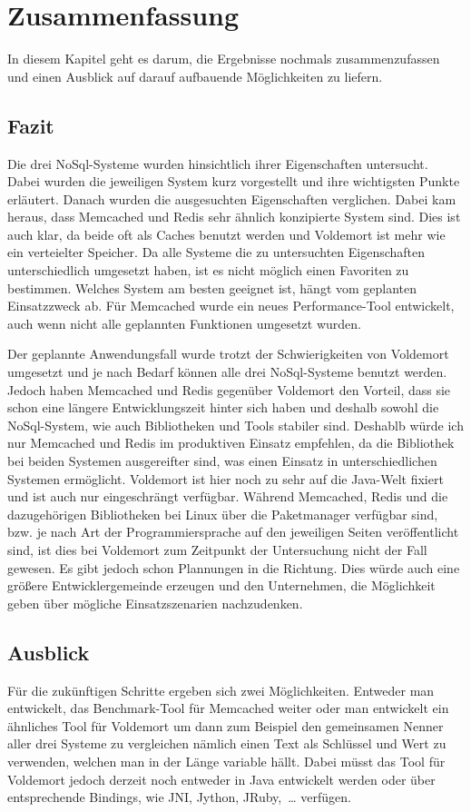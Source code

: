 \chapter{Zusammenfassung}
In diesem Kapitel geht es darum, die Ergebnisse nochmals zusammenzufassen und
einen Ausblick auf darauf aufbauende Möglichkeiten zu liefern.

\section{Fazit}
Die drei NoSql-Systeme wurden hinsichtlich ihrer Eigenschaften untersucht.
Dabei wurden die jeweiligen System kurz vorgestellt und ihre wichtigsten Punkte
erläutert. Danach wurden die ausgesuchten Eigenschaften verglichen. Dabei kam
heraus, dass Memcached und Redis sehr ähnlich konzipierte System sind. Dies ist
auch klar, da beide oft als Caches benutzt werden und Voldemort ist mehr wie
ein verteielter Speicher. Da alle Systeme die zu untersuchten Eigenschaften
unterschiedlich umgesetzt haben, ist es nicht möglich einen Favoriten zu
bestimmen. Welches System am besten geeignet ist, hängt vom geplanten
Einsatzzweck ab. Für Memcached wurde ein neues Performance-Tool entwickelt,
auch wenn nicht alle geplannten Funktionen umgesetzt wurden.

Der geplannte Anwendungsfall wurde trotzt der Schwierigkeiten von Voldemort
umgesetzt und je nach Bedarf können alle drei NoSql-Systeme benutzt werden.
Jedoch haben Memcached und Redis gegenüber Voldemort den Vorteil, dass sie schon
eine längere Entwicklungszeit hinter sich haben und deshalb sowohl die
NoSql-System, wie auch Bibliotheken und Tools stabiler sind. Deshablb würde
ich nur Memcached und Redis im produktiven Einsatz empfehlen, da die Bibliothek
bei beiden Systemen ausgereifter sind, was einen Einsatz in unterschiedlichen
Systemen ermöglicht. Voldemort ist hier noch zu sehr auf die Java-Welt fixiert
und ist auch nur eingeschrängt verfügbar. Während Memcached, Redis und die
dazugehörigen Bibliotheken bei Linux über die Paketmanager verfügbar sind, bzw.
je nach Art der Programmiersprache auf den jeweiligen Seiten veröffentlicht sind,
ist dies bei Voldemort zum Zeitpunkt der Untersuchung nicht der Fall gewesen.
Es gibt jedoch schon Plannungen in die Richtung. Dies würde auch eine größere
Entwicklergemeinde erzeugen und den Unternehmen, die Möglichkeit geben über
mögliche Einsatzszenarien nachzudenken.

\section{Ausblick}
Für die zukünftigen Schritte ergeben sich zwei Möglichkeiten. Entweder man
entwickelt, das Benchmark-Tool für Memcached weiter oder man entwickelt ein
ähnliches Tool für Voldemort um dann zum Beispiel den gemeinsamen Nenner aller
drei Systeme zu vergleichen nämlich einen Text als Schlüssel und Wert zu
verwenden, welchen man in der Länge variable hällt. Dabei müsst das Tool für
Voldemort jedoch derzeit noch entweder in Java entwickelt werden oder über
entsprechende Bindings, wie \gls{JNI}, Jython, JRuby,~\dots{} verfügen.

